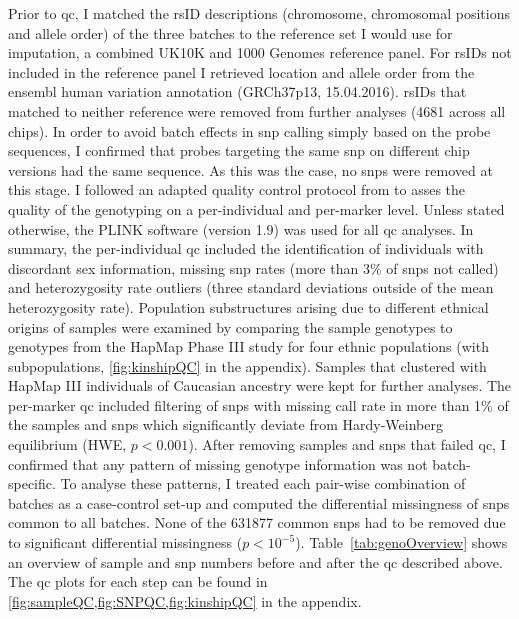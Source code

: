 Prior to \gls{qc}, I matched the rsID descriptions (chromosome, chromosomal positions and allele order) of the three batches to the reference set I would use for imputation, a combined UK10K \citep{UK10KConsortium2015} and \num{1000} Genomes \citep{1000Genomes2015} reference panel. For rsIDs not included in the reference panel I retrieved location and allele order from the ensembl human variation annotation (GRCh37p13, 15.04.2016). rsIDs that matched to neither reference were removed from further analyses (\num{4681} across all chips). In order to avoid batch effects in \gls{snp} calling simply based on the probe sequences, I confirmed that probes targeting the same \gls{snp} on different chip versions had the same sequence. As this was the case, no \glspl{snp} were removed at this stage. 
I followed an adapted quality control protocol from \citet{Anderson2010} to asses the quality of the genotyping on a per-individual and per-marker level. Unless stated otherwise, the PLINK software (version 1.9) \citep{Purcell2007, Chang2015} was used for all \gls{qc} analyses. In summary, the per-individual \gls{qc} included the identification of individuals with discordant sex information, missing \gls{snp} rates (more than 3\% of \glspl{snp} not called) and heterozygosity rate outliers (three standard deviations outside of the mean heterozygosity rate). Population substructures arising due to different ethnical origins of samples were examined by comparing the sample genotypes to genotypes from the HapMap Phase III study \citep{HapMap2005} for four ethnic populations (with subpopulations, \cref{fig:kinshipQC} in the appendix). Samples that clustered with HapMap III individuals of Caucasian ancestry were kept for further analyses. The per-marker \gls{qc} included filtering of \glspl{snp} with missing call rate in more than \num{1}\% of the samples and \glspl{snp} which significantly deviate from Hardy-Weinberg equilibrium (HWE, \(p < 0.001\)). After removing samples and \glspl{snp} that failed \gls{qc}, I confirmed that any pattern of missing genotype information was not batch-specific. To analyse these patterns, I treated each pair-wise combination of batches as a case-control set-up and computed the differential missingness of \glspl{snp} common to all batches. None of the \num{631877} common \glspl{snp} had to be removed due to significant differential missingness (\(p < 10^{-5}\)). Table~\ref{tab:genoOverview} shows an overview of sample and \gls{snp} numbers before and after the \gls{qc} described above. The \gls{qc} plots for each step can be found in \cref{fig:sampleQC,fig:SNPQC,fig:kinshipQC} in the appendix. 
